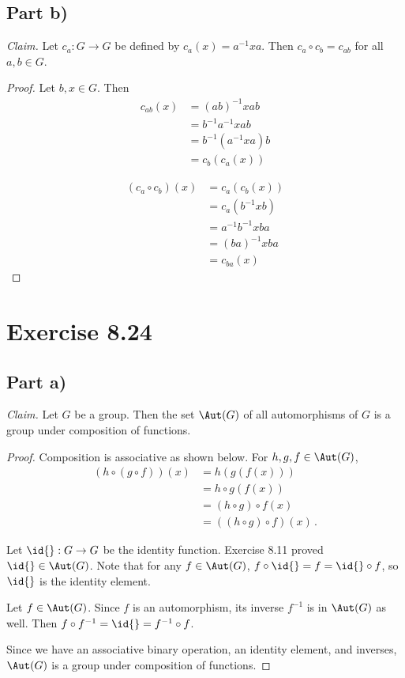 \documentclass{abrice}
\newcommand{\Claim}{\noindent\emph{Claim.}\xspace}%
\begin{document}
\subsection{Part b)}

\Claim Let $c_a : G \to G$ be defined by $c_a(x) = a^{-1} x a$. Then $c_a \circ
c_b = c_{ab}$ for all $a,b \in G$.

\begin{proof}
  Let $b,x \in G$. Then
  \begin{align*}
    c_{ab}(x)
    &= {(ab)}^{-1} x ab \\
    &= b^{-1} a^{-1} x ab \\
    &= b^{-1}(a^{-1} x a) b \\
    &= c_b(c_a(x))
  \end{align*}

  \begin{align*}
    (c_a \circ c_b)(x)
    &= c_a(c_b(x)) \\
    &= c_a(b^{-1} x b) \\
    &= a^{-1} b^{-1} x b a \\
    &= {(ba)}^{-1} x ba \\
    &= c_{ba}(x)
  \end{align*}
\end{proof}

\section{Exercise 8.24}

\subsection{Part a)}

\Claim Let $G$ be a group. Then the set $\Aut(G)$ of all automorphisms of $G$ is
a group under composition of functions.

\begin{proof}
  Composition is associative as shown below. For $h,g,f \in \Aut(G)$,
  \begin{align*}
    (h \circ (g \circ f))(x)
    &= h(g(f(x))) \\
    &= h \circ g(f(x)) \\
    &= (h \circ g) \circ f(x) \\
    &= ((h \circ g) \circ f) (x)\, .
  \end{align*}

  Let $\id{} : G \to G$ be the identity function. Exercise 8.11 proved $\id{} \in
  \Aut(G)$. Note that for any $f \in \Aut(G)$, $f \circ \id{} = f = \id{} \circ f$,
  so $\id{}$ is the identity element.

  Let $f \in \Aut(G)$. Since $f$ is an automorphism, its inverse $f^{-1}$ is in
  $\Aut(G)$ as well. Then $f \circ f^{-1} = \id{} = f^{-1} \circ f$.

  Since we have an associative binary operation, an identity element, and
  inverses, $\Aut(G)$ is a group under composition of functions.
\end{proof}
\end{document}
